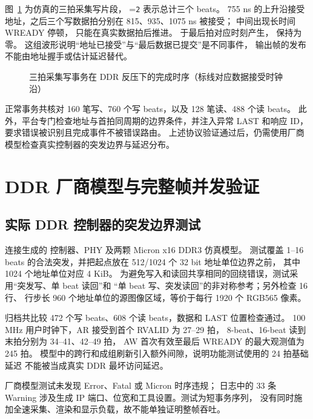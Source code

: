 图~\ref{fig:sim-ddr} 为仿真的三拍采集写片段，
=\texttt{2} 表示总计三个 beats。
755 ns 的上升沿接受地址，之后三个写数据拍分别在 815、935、1075 ns 被接受；
中间出现长时间 WREADY 停顿， 只能在真实数据拍后推进。
 于最后拍对应时刻产生， 保持为零。
这组波形说明“地址已接受”与“最后数据已提交”是不同事件，
输出帧的发布不能由地址握手或估计延迟替代。

\begin{figure}[htbp]\centering

\caption{三拍采集写事务在 DDR 反压下的完成时序（标线对应数据接受时钟沿）}
\label{fig:sim-ddr}
\end{figure}

正常事务共核对 160 笔写、760 个写 beats，以及 128 笔读、488 个读 beats。
此外，平台专门检查地址与首拍同周期的边界条件，并注入异常 LAST 和响应 ID，
要求错误被识别且完成事件不被错误路由。
上述协议验证通过后，仍需使用厂商模型检查真实控制器的突发边界与延迟分布。

\section{DDR 厂商模型与完整帧并发验证}
\subsection{实际 DDR 控制器的突发边界测试}
 连接生成的
 控制器、PHY 及两颗 Micron x16 DDR3 仿真模型。
测试覆盖 1--16 beats 的合法突发，并把起点放在 512/1024 个 32 bit 地址单位边界之前，
其中 1024 个地址单位对应 4 KiB。
为避免写入和读回共享相同的回绕错误，测试采用“突发写、单 beat 读回”和
“单 beat 写、突发读回”的非对称参考；另外检查 16 行、
行步长 960 个地址单位的源图像区域，等价于每行 1920 个 RGB565 像素。

归档共比较 472 个写 beats、608 个读 beats，数据和 LAST 位置检查通过。
100 MHz 用户时钟下，AR 接受到首个 RVALID 为 27--29 拍，
8-beat、16-beat 读到末拍分别为 34--41、42--49 拍，
AW 首次有效至最后 WREADY 的最大观测值为 245 拍。
模型中的跨行和成组刷新引入额外间隙，说明功能测试使用的 24 拍基础延迟
不能被当成真实 DDR 最坏访问延迟。

厂商模型测试未发现 Error、Fatal 或 Micron 时序违规；
日志中的 33 条 Warning 涉及生成 IP 端口、位宽和工具设置。测试为短事务序列，
没有同时施加全速采集、渲染和显示负载，故不能单独证明整帧吞吐。

